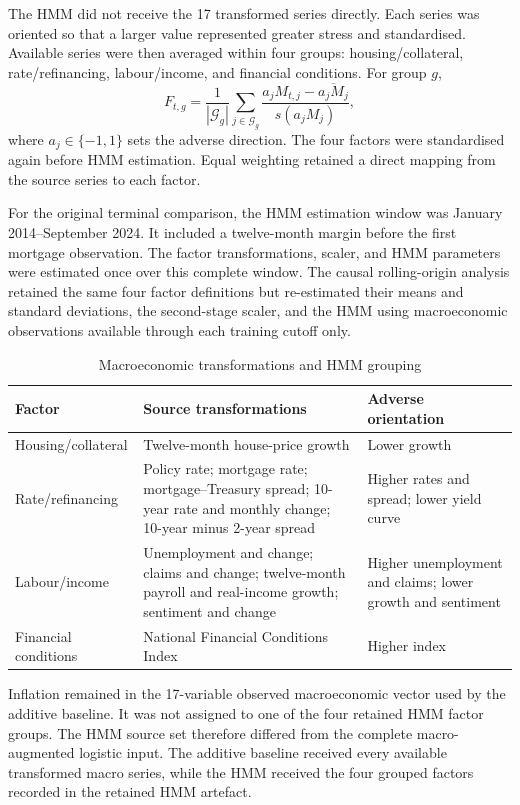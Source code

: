 The HMM did not receive the 17 transformed series directly. Each series was oriented so that a larger value represented greater stress and standardised. Available series were then averaged within four groups: housing/collateral, rate/refinancing, labour/income, and financial conditions. For group $g$,
\begin{equation}
F_{t,g}
=
\frac{1}{|\mathcal{G}_g|}
\sum_{j\in\mathcal{G}_g}
\frac{a_jM_{t,j}-\overline{a_jM_j}}{s(a_jM_j)},
\label{eq:interpretable-factor}
\end{equation}
where $a_j\in\{-1,1\}$ sets the adverse direction. The four factors were standardised again before HMM estimation. Equal weighting retained a direct mapping from the source series to each factor.

For the original terminal comparison, the HMM estimation window was January 2014--September 2024. It included a twelve-month margin before the first mortgage observation. The factor transformations, scaler, and HMM parameters were estimated once over this complete window. The causal rolling-origin analysis retained the same four factor definitions but re-estimated their means and standard deviations, the second-stage scaler, and the HMM using macroeconomic observations available through each training cutoff only.

\begin{table}[htbp]
\centering
\caption{Macroeconomic transformations and HMM grouping}
\label{tab:macro-transformations}
\footnotesize
\begin{tabular}{L{0.24\textwidth}L{0.31\textwidth}L{0.30\textwidth}}
\toprule
Factor & Source transformations & Adverse orientation \\
\midrule
Housing/collateral & Twelve-month house-price growth & Lower growth \\
Rate/refinancing & Policy rate; mortgage rate; mortgage--Treasury spread; 10-year rate and monthly change; 10-year minus 2-year spread & Higher rates and spread; lower yield curve \\
Labour/income & Unemployment and change; claims and change; twelve-month payroll and real-income growth; sentiment and change & Higher unemployment and claims; lower growth and sentiment \\
Financial conditions & National Financial Conditions Index & Higher index \\
\bottomrule
\end{tabular}
\end{table}

Inflation remained in the 17-variable observed macroeconomic vector used by the additive baseline. It was not assigned to one of the four retained HMM factor groups. The HMM source set therefore differed from the complete macro-augmented logistic input. The additive baseline received every available transformed macro series, while the HMM received the four grouped factors recorded in the retained HMM artefact.

